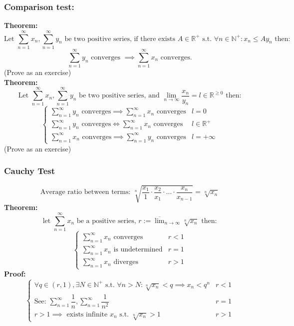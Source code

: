 \documentclass{article}
\newcommand{\0}{{\bf{0}}}
\begin{document}
\subsubsection{Comparison test:}
\textbf{Theorem:}
$$\mbox{Let }\sum_{n=1}^\infty x_n,\sum_{n=1}^\infty y_n \mbox{ be two positive series, if there exists }A\in\mathbb{R}^+\mbox{ s.t. }\forall n\in\mathbb{N}^+:x_n\le Ay_n\mbox{ then:}$$
$$\sum_{n=1}^\infty y_n\mbox{ converges }\implies\sum_{n=1}^\infty x_n\mbox{ converges.}$$
\null\hfill(Prove as an exercise)\\
\textbf{Theorem:}
$$\mbox{Let }\sum_{n=1}^\infty x_n,\sum_{n=1}^\infty y_n \mbox{ be two positive series, and }\lim_{n\to\infty}\frac{x_n}{y_n}=l\in\mathbb{R}^{\geq0}\mbox{ then:}$$
$$\begin{cases}
    \sum\limits_{n=1}^\infty y_n\mbox{ converges}\implies\sum\limits_{n=1}^\infty x_n\mbox{ converges}&l=0\\
    \sum\limits_{n=1}^\infty y_n\mbox{ converges}\iff\sum\limits_{n=1}^\infty x_n\mbox{ converges}&l\in\mathbb{R}^+\\
    \sum\limits_{n=1}^\infty x_n\mbox{ converges}\implies\sum\limits_{n=1}^\infty y_n\mbox{ converges}&l=+\infty
\end{cases}$$
\null\hfill{(Prove as an exercise)}
\subsubsection{Cauchy Test}
$$\mbox{Average ratio between terms: }\sqrt[n]{\frac{x_1}{1}\cdot\frac{x_2}{x_1}\cdot\dots\cdot\frac{x_n}{x_{n-1}}}=\sqrt[n]{x_n}$$
\textbf{Theorem:}
$$\mbox{let }\sum_{n=1}^\infty x_n\mbox{ be a positive series, }r:=\overline{\lim}_{n\to\infty}\sqrt[n]{x_n}\mbox{ then:}$$
$$\begin{cases}
    \sum\limits_{n=1}^\infty x_n\mbox{ converges}&r<1\\
    \sum\limits_{n=1}^\infty x_n\mbox{ is undetermined}&r=1\\
    \sum\limits_{n=1}^\infty x_n\mbox{ diverges}&r>1
\end{cases}$$
\textbf{Proof:}
$$\begin{cases}
    \forall q\in(r,1),\exists N\in\mathbb{N}^+\mbox{ s.t. }\forall n>N:\sqrt[n]{x_n}<q\implies x_n<q^n&r<1\\
    \mbox{See: }\sum\limits_{n=1}^\infty\dfrac{1}{n},\sum\limits_{n=1}^\infty\dfrac{1}{n^2}&r=1\\
    r>1\implies\mbox{ exists infinite }x_n\mbox{ s.t. }\sqrt[n]{x_n}>1&r>1
\end{cases}$$
\end{document}
